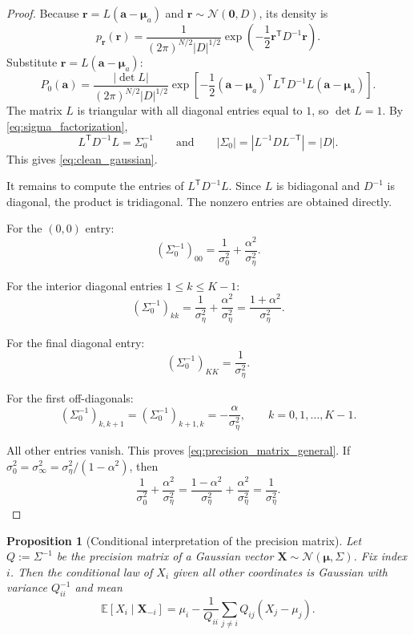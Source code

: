 \documentclass[11pt]{article}
\numberwithin{equation}{section}
\newtheorem{proposition}[theorem]{Proposition}
\theoremstyle{definition}
\theoremstyle{remark}
\newcommand{\E}{\mathbb{E}}
\newcommand{\trans}{\mathsf{T}}
\newcommand{\Ncal}{\mathcal{N}}
\begin{document}
\begin{proof}
Because $\mathbf r=L(\mathbf a-\boldsymbol{\mu}_a)$ and $\mathbf r\sim\Ncal(\mathbf 0,D)$, its density is
\[
p_{\mathbf r}(\mathbf r)
=
\frac{1}{(2\pi)^{N/2}|D|^{1/2}}
\exp\!\left(-\frac12\mathbf r^\trans D^{-1}\mathbf r\right).
\]
Substitute $\mathbf r=L(\mathbf a-\boldsymbol{\mu}_a)$:
\[
P_0(\mathbf a)
=
\frac{|\det L|}{(2\pi)^{N/2}|D|^{1/2}}
\exp\!\left[-\frac12(\mathbf a-\boldsymbol{\mu}_a)^\trans L^\trans D^{-1}L(\mathbf a-\boldsymbol{\mu}_a)\right].
\]
The matrix $L$ is triangular with all diagonal entries equal to $1$, so $\det L=1$. By \eqref{eq:sigma_factorization},
\[
L^\trans D^{-1}L=\Sigma_0^{-1}
\qquad\text{and}\qquad
|\Sigma_0|=|L^{-1}DL^{-\trans}|=|D|.
\]
This gives \eqref{eq:clean_gaussian}.

It remains to compute the entries of $L^\trans D^{-1}L$. Since $L$ is bidiagonal and $D^{-1}$ is diagonal, the product is tridiagonal. The nonzero entries are obtained directly.

For the $(0,0)$ entry:
\[
(\Sigma_0^{-1})_{00}=\frac{1}{\sigma_0^2}+\frac{\alpha^2}{\sigma_\eta^2}.
\]

For the interior diagonal entries $1\leq k\leq K-1$:
\[
(\Sigma_0^{-1})_{kk}=\frac{1}{\sigma_\eta^2}+\frac{\alpha^2}{\sigma_\eta^2}
=\frac{1+\alpha^2}{\sigma_\eta^2}.
\]

For the final diagonal entry:
\[
(\Sigma_0^{-1})_{KK}=\frac{1}{\sigma_\eta^2}.
\]

For the first off-diagonals:
\[
(\Sigma_0^{-1})_{k,k+1}=(\Sigma_0^{-1})_{k+1,k}
=-\frac{\alpha}{\sigma_\eta^2},
\qquad k=0,1,\dots,K-1.
\]

All other entries vanish. This proves \eqref{eq:precision_matrix_general}. If $\sigma_0^2=\sigma_\infty^2=\sigma_\eta^2/(1-\alpha^2)$, then
\[
\frac{1}{\sigma_0^2}+\frac{\alpha^2}{\sigma_\eta^2}
=
\frac{1-\alpha^2}{\sigma_\eta^2}+\frac{\alpha^2}{\sigma_\eta^2}
=
\frac{1}{\sigma_\eta^2}.
\]
\end{proof}

\begin{proposition}[Conditional interpretation of the precision matrix]\label{prop:conditional_mean}
Let $Q:=\Sigma^{-1}$ be the precision matrix of a Gaussian vector $\mathbf X\sim\Ncal(\boldsymbol{\mu},\Sigma)$. Fix index $i$. Then the conditional law of $X_i$ given all other coordinates is Gaussian with variance $Q_{ii}^{-1}$ and mean
\begin{equation}\label{eq:conditional_mean}
\E[X_i\mid \mathbf X_{-i}]
=
\mu_i-\frac{1}{Q_{ii}}\sum_{j\neq i}Q_{ij}(X_j-\mu_j).
\end{equation}
\end{proposition}
\end{document}
